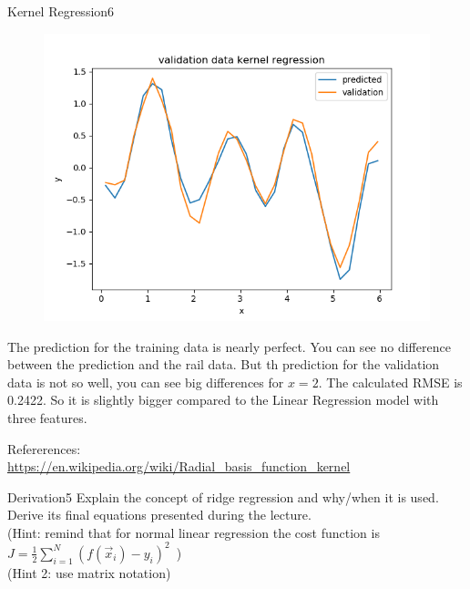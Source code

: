 \begin{questions}
\begin{question}{Kernel Regression}{6}
\begin{answer}
\begin{figure}[H]
\begin{minipage}{.5\textwidth}
		\end{minipage}%
		\begin{minipage}{.5\textwidth}
			\centering
			\includegraphics[width=1\textwidth]{img/3g2.png} 
		\end{minipage}
	\end{figure}
	
	
		The prediction for the training data is nearly perfect. You can see no difference between the prediction and the rail data. But th prediction for the validation data is not so well, you can see big differences for $x=2$. The calculated RMSE is 0.2422. So it is slightly bigger compared to the Linear Regression model with three features.
		
	
	Refererences:\\
	\url {https://en.wikipedia.org/wiki/Radial_basis_function_kernel}
	
	\end{answer}
	\end{question}
	
	
	
	\begin{question}[bonus]{Derivation}{5}
		Explain the concept of ridge regression and why/when it is used.
		Derive its final equations presented during the lecture.\\
		(Hint: remind that for normal linear regression the cost function is $J = \frac{1}{2}\sum_{i=1}^N ( f(\vec x_i) - y_i ) ^2 \,$ )\\
		(Hint 2: use matrix notation)
		

\end{question}
\end{questions}
